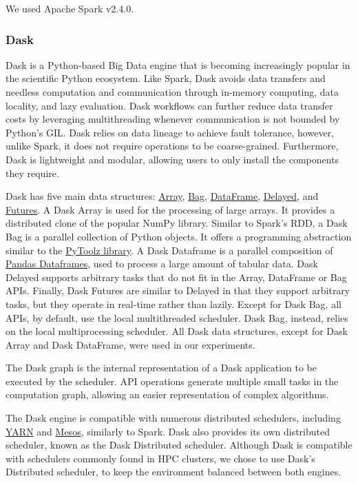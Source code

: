 \documentclass[conference]{IEEEtran}
\begin{document}
We used Apache Spark v2.4.0.

\subsubsection{Dask} Dask is a Python-based Big Data engine that is becoming
increasingly popular in the scientific Python ecosystem. Like Spark, Dask avoids data transfers and needless computation and communication through
in-memory computing, data locality, and lazy evaluation. Dask workflows can 
further reduce data transfer costs by leveraging multithreading whenever 
communication is not bounded by Python's GIL. Dask relies on data 
lineage to achieve fault tolerance, however, unlike Spark, it does not require
operations to be coarse-grained. Furthermore, Dask is lightweight and modular,
allowing users to only install the components they require.

Dask has five main data structures:
\href{https://docs.dask.org/en/latest/array.html}{Array}, \href{https://docs.dask.org/en/latest/bag.html}{Bag},
\href{https://docs.dask.org/en/latest/dataframe.html}{DataFrame},
 \href{https://docs.dask.org/en/latest/delayed.html}{Delayed}, 
 and \href{https://docs.dask.org/en/latest/futures.html}{Futures}. A Dask
Array is used for the
processing of large arrays. It provides a distributed clone of the popular NumPy
library. Similar to Spark's RDD, a Dask
Bag is a parallel
collection of Python objects. It offers a programming abstraction similar to the
\href{https://toolz.readthedocs.io/en/latest/}{PyToolz library}. A Dask
Dataframe is a parallel
composition of
\href{http://pandas.pydata.org/pandas-docs/stable/reference/api/pandas.DataFrame.html}{Pandas Dataframes},
 used to process a large amount of tabular data.
Dask Delayed supports
arbitrary tasks
that do not fit in the Array, DataFrame or Bag APIs. Finally,
Dask Futures are similar to
Delayed in that they support arbitrary tasks, but they operate in real-time
rather than lazily. Except for Dask Bag, all APIs, by default, use
the local multithreaded scheduler. Dask Bag, instead, relies on the local
multiprocessing scheduler.  All Dask data structures, except for
Dask Array and Dask DataFrame, were used in our experiments.


The Dask graph is the internal representation of a Dask application to be
executed  by the scheduler. API operations generate multiple small tasks in
the computation graph, allowing an easier representation of complex
algorithms.

The Dask engine is compatible with numerous distributed schedulers, including 
\href{https://github.com/dask/dask-yarn}{YARN} and
\href{https://github.com/mrocklin/dask-mesos}{Mesos}, similarly to Spark. Dask 
also provides its own distributed scheduler, known as the Dask Distributed
scheduler. Although Dask is compatible with schedulers commonly found in HPC
clusters, we chose to use Dask's Distributed scheduler, to keep the environment
balanced between both engines.
\end{document}
